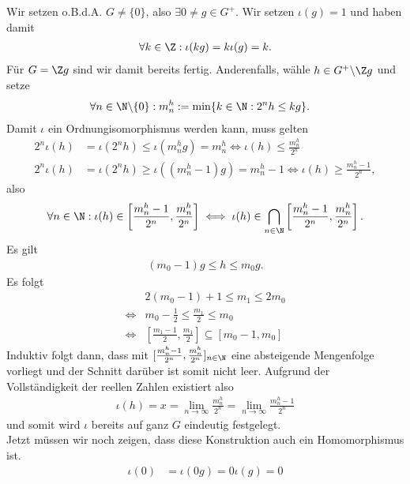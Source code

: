 \begin{solution}
Wir setzen o.B.d.A. $G \neq \{0\}$, also $\exists 0 \neq g \in G^+$.
Wir setzen $\iota(g) = 1$ und haben damit
\begin{align*}
  \forall k \in \Z: \iota(kg) = k\iota(g) = k.
\end{align*}
Für $G = \Z g$ sind wir damit bereits fertig.
Anderenfalls, wähle $h \in G^+\backslash \Z g$ und setze
\begin{align*}
  \forall n \in \N\backslash \{0\}: m_n^h &:= \min\{k \in \N: 2^nh \leq kg\}.
\end{align*}
Damit $\iota$ ein Ordnungisomorphismus werden kann, muss gelten
\begin{align*}
  2^n \iota(h) &= \iota(2^nh) \leq \iota(m_n^hg) = m_n^h \iff \iota(h) \leq \frac{m_n^h}{2^n} \\
  2^n \iota(h) &= \iota(2^nh) \geq \iota((m_n^h - 1)g) = m_n^h - 1 \iff \iota(h) \geq \frac{m_n^h - 1}{2^n},
\end{align*}
also
\begin{align*}
  \forall n \in \N: \iota(h) \in \left[\frac{m_n^h-1}{2^n},\frac{m_n^h}{2^n}\right]
  \iff \iota(h) \in \bigcap_{n \in \N} \left[\frac{m_n^h-1}{2^n},\frac{m_n^h}{2^n}\right].
\end{align*}
Es gilt
\begin{align*}
  (m_0 - 1)g \leq h \leq m_0g.
\end{align*}
Es folgt
\begin{align*}
  &2(m_0 - 1) + 1 \leq m_1 \leq  2m_0 \\
  \iff &m_0 - \frac{1}{2} \leq \frac{m_1}{2} \leq m_0 \\
  \iff &\left[\frac{m_1-1}{2},\frac{m_1}{2}\right] \subseteq \left[m_0 -1,m_0\right]
\end{align*}
Induktiv folgt dann, dass mit $[\frac{m_n^h-1}{2^n},\frac{m_n^h}{2^n}]_{n \in \N}$
eine absteigende Mengenfolge vorliegt und der Schnitt darüber ist somit nicht leer.
Aufgrund der Vollständigkeit der reellen Zahlen existiert also
\begin{align*}
  \iota(h) = x = \lim_{n \rightarrow \infty} \frac{m_n^h}{2^n} = \lim_{n \rightarrow \infty} \frac{m_n^h-1}{2^n}
\end{align*}
und somit wird $\iota$ bereits auf ganz $G$ eindeutig festgelegt. \\
Jetzt müssen wir noch zeigen, dass diese Konstruktion auch ein Homomorphismus ist.
\begin{align*}
  \iota(0) &= \iota(0g) = 0\iota(g) = 0 \\

\end{align*}
\end{solution}
